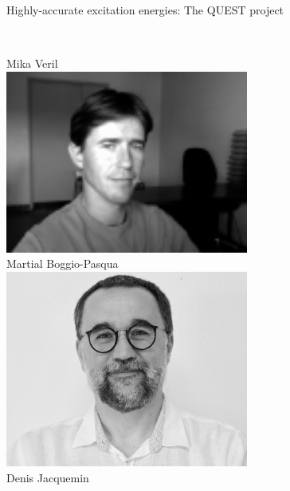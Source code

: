 \documentclass[aspectratio=169,9pt]{beamer}
\begin{document}
\begin{frame}{Highly-accurate excitation energies: The QUEST project}
\begin{columns}
\begin{column}{0.20\textwidth}
                        \\
                        Mika Veril
                         \\
                         \bigskip
                        \includegraphics[width=0.6\textwidth]{fig/Martial}
                        \\
                        Martial Boggio-Pasqua
                         \\
                         \bigskip
                        \includegraphics[width=0.6\textwidth]{fig/Denis}
                        \\
                        Denis Jacquemin
                \end{column}
        \end{columns}
\end{frame}
\end{document}
